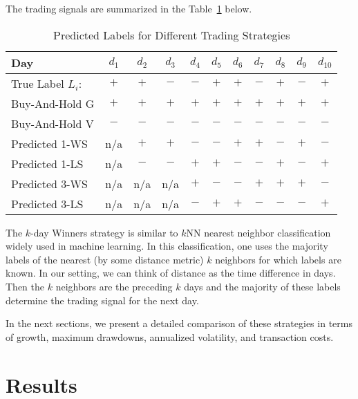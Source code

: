 \documentclass{article}
\begin{document}
The trading signals are summarized in the Table~\ref{tab_signals} below.
\begin{table}[!ht]
    \centering
    \caption{Predicted Labels for Different Trading Strategies}
    \vspace{0.1in}
    \begin{tabular}{l | c c c c c  c c c c c}
    \hline
        Day & $d_{1}$ & $d_{2}$ & $d_{3}$ & $d_{4}$ & $d_{5}$ & $d_{6}$ & $d_{7}$ & $d_{8}$ & $d_{9}$ & $d_{10}$ \\ \hline
       True Label $L_{i}$: & $+$ & $+$ & $-$ & $-$ & $+$ & $+$ & $-$ & $+$ & $-$ & $+$\\

        Buy-And-Hold G & $+$ & $+$ & $+$ & $+$ & $+$
         & $+$ & $+$ & $+$ & $+$ & $+$\\
        Buy-And-Hold V & $-$ & $-$ & $-$ & $-$ & $-$ & $-$ & $-$ & $-$ & $-$ & $-$\\
        Predicted 1-WS     & n/a & $+$ & $+$ & $-$ & $-$ & $+$ & $+$ & $-$ & $+$ & $-$\\
        Predicted 1-LS     & n/a & $-$ & $-$ & $+$ & $+$ & $-$ & $-$ & $+$ & $-$ & $+$\\
        Predicted 3-WS & n/a & n/a & n/a & $+$ & $-$ & $-$ & $+$ & $+$ & $+$ & $-$\\
        Predicted 3-LS & n/a & n/a & n/a & $-$ & $+$ & $+$ & $-$ & $-$ & $-$ & $+$\\
        \hline
\end{tabular}
\label{tab_signals}
\end{table}

The $k$-day Winners strategy is similar to $k$NN nearest neighbor classification widely used in machine learning. In this classification, one uses the majority labels of the nearest (by some distance metric) $k$ neighbors for which labels are known. In our setting, we can think of distance as the time difference in days. 
Then the $k$ neighbors are the preceding $k$ days and the majority of these labels determine the trading signal for the next day.

In the next sections, we present a detailed comparison of these strategies in terms of growth, maximum drawdowns, annualized volatility, and transaction costs.


\section{Results}
\end{document}
